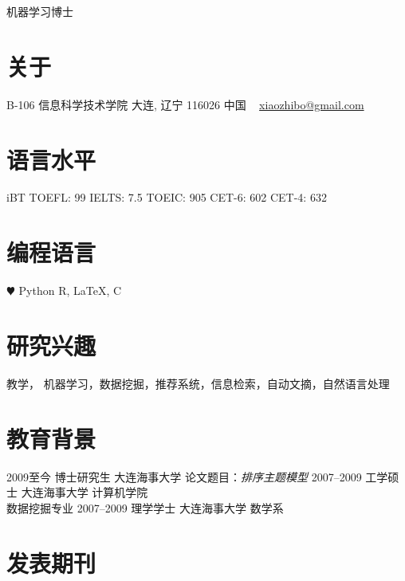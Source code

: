 \documentclass[]{friggeri-cv}
\begin{document}
       {机器学习博士}


\begin{aside}
  \section{关于}
    B-106
    信息科学技术学院
    大连, 辽宁 116026
    中国
    ~
    \href{mailto:xiaozhibo@gmail.com}{xiaozhibo@gmail.com}
  \section{语言水平}
    iBT TOEFL: 99
    IELTS: 7.5
    TOEIC: 905
    CET-6: 602
    CET-4: 632
  \section{编程语言}
    {\color{red} $\varheartsuit$} Python
    R, \LaTeX, C
\end{aside}

\section{研究兴趣}

教学， 机器学习，数据挖掘，推荐系统，信息检索，自动文摘，自然语言处理


\section{教育背景}


\begin{entrylist}
  \entry
    {2009至今}
    {博士研究生}
    {大连海事大学}
    {论文题目：\emph{排序主题模型}}
  \entry
    {2007–2009}
    {工学硕士}
    {大连海事大学}
    {计算机学院\\
    数据挖掘专业}
  \entry
    {2007–2009}
    {理学学士}
    {大连海事大学}
    {数学系}
\end{entrylist}


\section{发表期刊}


\begin{refsection}
  \nocite{*}
  \printbibliography[sorting=chronological, type=inproceedings, title={international peer-reviewed conferences/proceedings}, notkeyword={france}, heading=subbibliography]
\end{refsection}
\begin{refsection}
  \nocite{*}
  \printbibliography[sorting=chronological, type=inproceedings, title={local peer-reviewed conferences/proceedings}, keyword={france}, heading=subbibliography]
\end{refsection}
\end{document}
